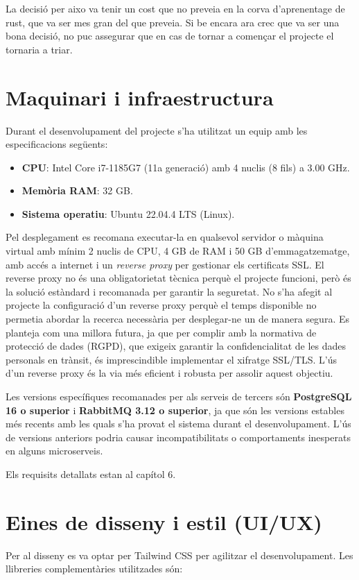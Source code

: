 La decisió per aixo va tenir un cost que no preveia en la corva d'aprenentage de rust, que va ser mes gran del que preveia. Si be encara ara crec que va ser una bona decisió, no puc assegurar que en cas de tornar a començar el projecte el tornaria a triar.

\section{Maquinari i infraestructura}
Durant el desenvolupament del projecte s'ha utilitzat un equip amb les especificacions següents:

\begin{itemize}
\item \textbf{CPU}: Intel Core i7-1185G7 (11a generació) amb 4 nuclis (8 fils) a 3.00 GHz.
\item \textbf{Memòria RAM}: 32 GB.
\item \textbf{Sistema operatiu}: Ubuntu 22.04.4 LTS (Linux).
\end{itemize}

Pel desplegament es recomana executar-la en qualsevol servidor o màquina virtual amb mínim 2 nuclis de CPU, 4 GB de RAM i 50 GB d'emmagatzematge, amb accés a internet i un \textit{reverse proxy} per gestionar els certificats SSL. El reverse proxy no és una obligatorietat tècnica perquè el projecte funcioni, però és la solució estàndard i recomanada per garantir la seguretat. No s'ha afegit al projecte la configuració d'un reverse proxy perquè el temps disponible no permetia abordar la recerca necessària per desplegar-ne un de manera segura. Es planteja com una millora futura, ja que per complir amb la normativa de protecció de dades (RGPD), que exigeix garantir la confidencialitat de les dades personals en trànsit, és imprescindible implementar el xifratge SSL/TLS. L'ús d'un reverse proxy és la via més eficient i robusta per assolir aquest objectiu.

Les versions específiques recomanades per als serveis de tercers són \textbf{PostgreSQL 16 o superior} i \textbf{RabbitMQ 3.12 o superior}, ja que són les versions estables més recents amb les quals s'ha provat el sistema durant el desenvolupament. L'ús de versions anteriors podria causar incompatibilitats o comportaments inesperats en alguns microserveis.

Els requisits detallats estan al capítol 6.

\section{Eines de disseny i estil (UI/UX)}
Per al disseny es va optar per Tailwind CSS per agilitzar el desenvolupament. Les llibreries complementàries utilitzades són:

